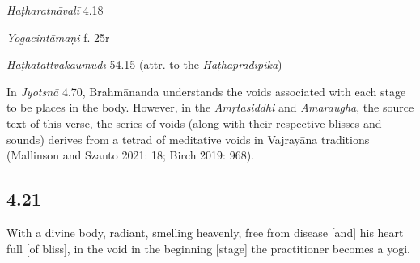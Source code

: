 \begin{ekdosis}
\begin{testimonia}[hp04_020]
\emph{Haṭharatnāvalī} 4.18
\begin{versinnote}
\tl{\var{yo nādaḥ ] ānandaḥ \vl}\\+}
\tl{\var{vicitrakvaṇado ] vicitrakvaṇako \vl}\\!}
\end{versinnote}

\emph{Yogacintāmaṇi} f. 25r
\begin{versinnote}
\end{versinnote}

\emph{Haṭhatattvakaumudī} 54.15 (attr. to the \emph{Haṭhapradīpikā})
\begin{versinnote}
\end{versinnote}
\end{testimonia}

\begin{philcomm}[hp04_020]
In \emph{Jyotsnā} 4.70, Brahmānanda understands the voids associated with each stage to be places in the body. However, in the \emph{Amṛtasiddhi} and \emph{Amaraugha}, the source text of this verse, the series of voids (along with their respective blisses and sounds) derives from a tetrad of meditative voids in Vajrayāna traditions (Mallinson and Szanto 2021: 18; Birch 2019: 968). 
\end{philcomm}

\subsection*{4.21}
\begin{translation}[hp04_021]
With a divine body, radiant, smelling heavenly, free from disease [and] his heart full [of bliss], in the void in the beginning [stage] the practitioner becomes a yogi.

\end{translation}


\end{ekdosis}
